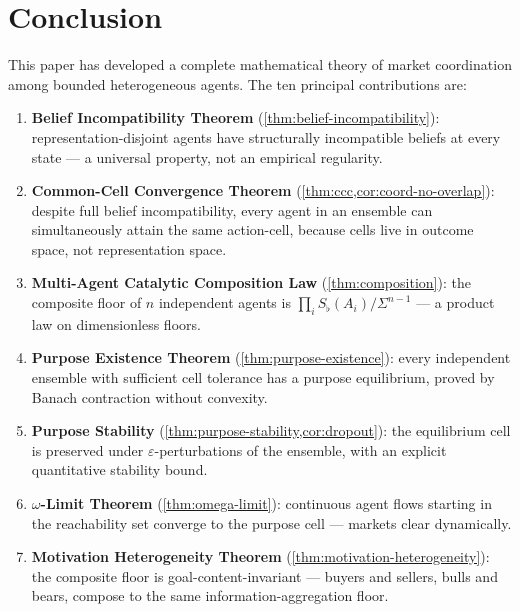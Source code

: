 \documentclass[twocolumn,11pt,a4paper]{article}
\theoremstyle{remark}
\newcommand{\Sflat}{S_{\flat}}
\begin{document}
\section{Conclusion}
\label{sec:conclusion}

This paper has developed a complete mathematical theory of market coordination
among bounded heterogeneous agents.  The ten principal contributions are:

\begin{enumerate}[leftmargin=*, label=\textbf{(\roman*)}]
\item \textbf{Belief Incompatibility Theorem}
  (\cref{thm:belief-incompatibility}): representation-disjoint agents have
  structurally incompatible beliefs at every state — a universal property,
  not an empirical regularity.

\item \textbf{Common-Cell Convergence Theorem}
  (\cref{thm:ccc,cor:coord-no-overlap}): despite full belief incompatibility,
  every agent in an ensemble can simultaneously attain the same action-cell,
  because cells live in outcome space, not representation space.

\item \textbf{Multi-Agent Catalytic Composition Law}
  (\cref{thm:composition}): the composite floor of $n$ independent agents
  is $\prod_i \Sflat(A_i)/\Sigma^{n-1}$ — a product law on dimensionless
  floors.

\item \textbf{Purpose Existence Theorem}
  (\cref{thm:purpose-existence}): every independent ensemble with sufficient
  cell tolerance has a purpose equilibrium, proved by Banach contraction
  without convexity.

\item \textbf{Purpose Stability}
  (\cref{thm:purpose-stability,cor:dropout}): the equilibrium cell is
  preserved under $\varepsilon$-perturbations of the ensemble, with an
  explicit quantitative stability bound.

\item \textbf{$\omega$-Limit Theorem}
  (\cref{thm:omega-limit}): continuous agent flows starting in the
  reachability set converge to the purpose cell — markets clear dynamically.

\item \textbf{Motivation Heterogeneity Theorem}
  (\cref{thm:motivation-heterogeneity}): the composite floor is
  goal-content-invariant — buyers and sellers, bulls and bears, compose
  to the same information-aggregation floor.


\end{enumerate}
\end{document}
